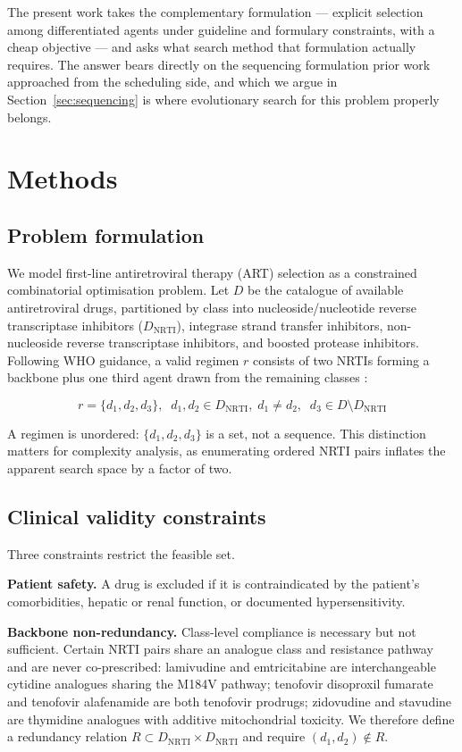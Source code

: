\documentclass[conference]{IEEEtran}
\begin{document}
The present work takes the complementary formulation --- explicit selection among differentiated agents under guideline and formulary constraints, with a cheap objective --- and asks what search method that formulation actually requires. The answer bears directly on the sequencing formulation prior work approached from the scheduling side, and which we argue in Section~\ref{sec:sequencing} is where evolutionary search for this problem properly belongs.

\section{Methods}\label{sec:methods}

\subsection{Problem formulation}\label{sec:formulation}

We model first-line antiretroviral therapy (ART) selection as a constrained combinatorial optimisation problem. Let $D$ be the catalogue of available antiretroviral drugs, partitioned by class into nucleoside/nucleotide reverse transcriptase inhibitors ($D_{\text{NRTI}}$), integrase strand transfer inhibitors, non-nucleoside reverse transcriptase inhibitors, and boosted protease inhibitors. Following WHO guidance, a valid regimen $r$ consists of two NRTIs forming a backbone plus one third agent drawn from the remaining classes \cite{who2021consolidated,who2018update}:

$$r = \{d_1, d_2, d_3\},\;\; d_1, d_2 \in D_{\text{NRTI}},\; d_1 \neq d_2,\;\; d_3 \in D \setminus D_{\text{NRTI}}$$

A regimen is unordered: $\{d_1, d_2, d_3\}$ is a set, not a sequence. This distinction matters for complexity analysis, as enumerating ordered NRTI pairs inflates the apparent search space by a factor of two.

\subsection{Clinical validity constraints}\label{sec:constraints}

Three constraints restrict the feasible set.

\textbf{Patient safety.} A drug is excluded if it is contraindicated by the patient's comorbidities, hepatic or renal function, or documented hypersensitivity.

\textbf{Backbone non-redundancy.} Class-level compliance is necessary but not sufficient. Certain NRTI pairs share an analogue class and resistance pathway and are never co-prescribed: lamivudine and emtricitabine are interchangeable cytidine analogues sharing the M184V pathway; tenofovir disoproxil fumarate and tenofovir alafenamide are both tenofovir prodrugs; zidovudine and stavudine are thymidine analogues with additive mitochondrial toxicity. We therefore define a redundancy relation $R \subset D_{\text{NRTI}} \times D_{\text{NRTI}}$ and require $(d_1, d_2) \notin R$.
\end{document}
